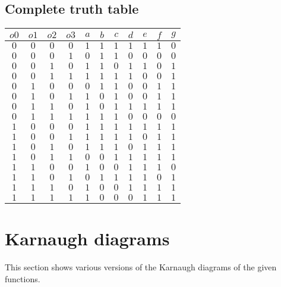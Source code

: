 \documentclass [15pt,a4paper,twoside]{article}
\begin{document}
\subsection{Complete truth table}
\begin{center}
\begin{tabular}{cccc|ccccccc}
$o0$&$o1$&$o2$&$o3$&$a$&$b$&$c$&$d$&$e$&$f$&$g$\\
\hline
$0$&$0$&$0$&$0$&$1$&$1$&$1$&$1$&$1$&$1$&$0$\\
$0$&$0$&$0$&$1$&$0$&$1$&$1$&$0$&$0$&$0$&$0$\\
$0$&$0$&$1$&$0$&$1$&$1$&$0$&$1$&$1$&$0$&$1$\\
$0$&$0$&$1$&$1$&$1$&$1$&$1$&$1$&$0$&$0$&$1$\\
$0$&$1$&$0$&$0$&$0$&$1$&$1$&$0$&$0$&$1$&$1$\\
$0$&$1$&$0$&$1$&$1$&$0$&$1$&$0$&$0$&$1$&$1$\\
$0$&$1$&$1$&$0$&$1$&$0$&$1$&$1$&$1$&$1$&$1$\\
$0$&$1$&$1$&$1$&$1$&$1$&$1$&$0$&$0$&$0$&$0$\\
$1$&$0$&$0$&$0$&$1$&$1$&$1$&$1$&$1$&$1$&$1$\\
$1$&$0$&$0$&$1$&$1$&$1$&$1$&$1$&$0$&$1$&$1$\\
$1$&$0$&$1$&$0$&$1$&$1$&$1$&$0$&$1$&$1$&$1$\\
$1$&$0$&$1$&$1$&$0$&$0$&$1$&$1$&$1$&$1$&$1$\\
$1$&$1$&$0$&$0$&$1$&$0$&$0$&$1$&$1$&$1$&$0$\\
$1$&$1$&$0$&$1$&$0$&$1$&$1$&$1$&$1$&$0$&$1$\\
$1$&$1$&$1$&$0$&$1$&$0$&$0$&$1$&$1$&$1$&$1$\\
$1$&$1$&$1$&$1$&$1$&$0$&$0$&$0$&$1$&$1$&$1$\\

\end{tabular}
\end{center}
\section{Karnaugh diagrams}
This section shows various versions of the Karnaugh diagrams of the given functions.
\end{document}
